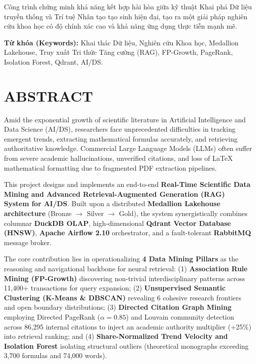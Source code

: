 Công trình chứng minh khả năng kết hợp hài hòa giữa kỹ thuật Khai phá Dữ liệu truyền thống và Trí tuệ Nhân tạo tạo sinh hiện đại, tạo ra một giải pháp nghiên cứu khoa học có độ chính xác cao và khả năng ứng dụng thực tiễn mạnh mẽ.

\vspace{0.4cm}
\noindent\textbf{Từ khóa (Keywords):} Khai thác Dữ liệu, Nghiên cứu Khoa học, Medallion Lakehouse, Truy xuất Tri thức Tăng cường (RAG), FP-Growth, PageRank, Isolation Forest, Qdrant, AI/DS.

\clearpage

\chapter*{ABSTRACT}

Amid the exponential growth of scientific literature in Artificial Intelligence and Data Science (AI/DS), researchers face unprecedented difficulties in tracking emergent trends, extracting mathematical formulas accurately, and retrieving authoritative knowledge. Commercial Large Language Models (LLMs) often suffer from severe academic hallucinations, unverified citations, and loss of LaTeX mathematical formatting due to fragmented PDF extraction pipelines.

This project designs and implements an end-to-end \textbf{Real-Time Scientific Data Mining and Advanced Retrieval-Augmented Generation (RAG) System for AI/DS}. Built upon a distributed \textbf{Medallion Lakehouse architecture} (Bronze $\to$ Silver $\to$ Gold), the system synergistically combines columnar \textbf{DuckDB OLAP}, high-dimensional \textbf{Qdrant Vector Database (HNSW)}, \textbf{Apache Airflow 2.10} orchestrator, and a fault-tolerant \textbf{RabbitMQ} message broker.

The core contribution lies in operationalizing \textbf{4 Data Mining Pillars} as the reasoning and navigational backbone for neural retrieval: (1) \textbf{Association Rule Mining (FP-Growth)} discovering non-trivial interdisciplinary patterns across 11,400+ transactions for query expansion; (2) \textbf{Unsupervised Semantic Clustering (K-Means \& DBSCAN)} revealing 6 cohesive research frontiers and open boundary distributions; (3) \textbf{Directed Citation Graph Mining} employing Directed PageRank ($\alpha=0.85$) and Louvain community detection across 86,295 internal citations to inject an academic authority multiplier (+25\%) into retrieval ranking; and (4) \textbf{Share-Normalized Trend Velocity and Isolation Forest} isolating structural outliers (theoretical monographs exceeding 3,700 formulas and 74,000 words).

